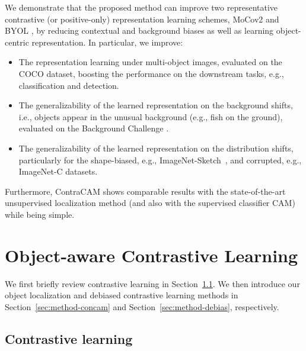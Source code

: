 \documentclass{article}
\begin{document}
We demonstrate that the proposed method can improve two representative contrastive (or positive-only) representation learning schemes, MoCov2 \citep{chen2020improved} and BYOL \citep{grill2020bootstrap}, by reducing contextual and background biases as well as learning object-centric representation. In particular, we improve:
\begin{itemize}[topsep=1.0pt,itemsep=1.0pt,leftmargin=5.5mm]
    \item The representation learning under multi-object images, evaluated on the COCO \citep{lin2014microsoft} dataset, boosting the performance on the downstream tasks, e.g., classification and detection.
    \item The generalizability of the learned representation on the background shifts, i.e., objects appear in the unusual background (e.g., fish on the ground), evaluated on the Background Challenge \citep{xiao2021noise}.
    \item The generalizability of the learned representation on the distribution shifts, particularly for the shape-biased, e.g., ImageNet-Sketch~\citep{wang2019learning}, and corrupted, e.g., ImageNet-C \citep{hendrycks2019robustness} datasets.
\end{itemize}
Furthermore, ContraCAM shows comparable results with the state-of-the-art unsupervised localization method (and also with the supervised classifier CAM) while being simple.


\section{Object-aware Contrastive Learning}
\label{sec:method}

We first briefly review contrastive learning in Section~\ref{sec:method-prelim}. We then introduce our object localization and debiased contrastive learning methods in Section~\ref{sec:method-concam} and Section~\ref{sec:method-debias}, respectively.


\subsection{Contrastive learning}
\label{sec:method-prelim}
\end{document}
